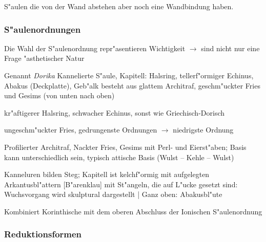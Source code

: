 \documentclass[]{scrartcl}
\begin{document}
\begin{description}[leftmargin=!,labelwidth=\widthof{\bfseries P2}]
  \item[Zahnschnitt]
  \item[Konsole]
  \item[Vorlage] S"aulen die von der Wand abstehen aber noch eine Wandbindung haben.
  \item[Freis"aule]
\end{description}

\subsubsection{S"aulenordnungen}

Die Wahl der S"aulenordnung repr"asentieren Wichtigkeit $\rightarrow$ sind nicht nur eine Frage "asthetischer Natur\\

\begin{description}[leftmargin=!,labelwidth=\widthof{\bfseries Griechisch-Doris}]
  \item[Griechisch-Dorisch] Genannt \emph{Dorika} Kannelierte S"aule, Kapitell: Halsring, tellerf"ormiger Echinus, Abakus (Deckplatte), Geb"alk besteht aus glattem Architraf, geschm"uckter Fries und Gesims (von unten nach oben) 
  \item[R"omisch-Dorisch] kr"aftigerer Halsring, schwacher Echinus, sonst wie Griechisch-Dorisch
  \item[Toskanisch] ungeschm"uckter Fries, gedrungenste Ordnungen $\rightarrow$ niedrigste Ordnung
  \item[Ionisch] Profilierter Architraf, Nackter Fries, Gesims mit Perl- und Eierst"aben; Basis kann unterschiedlich sein, typisch attische Basis (Wulst -- Kehle -- Wulst)
  \item[Korinthisch] Kanneluren bilden Steg; Kapitell ist kelchf"ormig mit aufgelegten Arkantusbl"attern [B"arenklau] mit St"angeln, die auf L"ucke gesetzt sind: Wuchsvorgang wird skulptural dargestellt | Ganz oben: Abakusbl"ute
  \item[Komposit] Kombiniert Korinthische mit dem oberen Abschluss der Ionischen S"aulenordnung

\end{description}

\subsubsection{Reduktionsformen}
\end{document}
